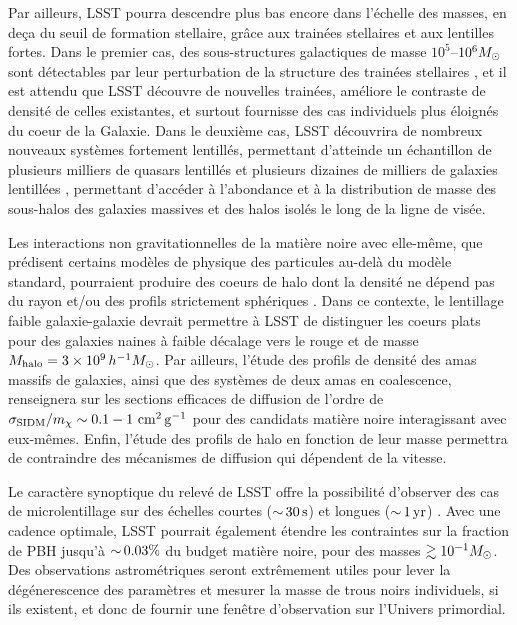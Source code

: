 \documentclass[12pt]{article}
\begin{document}
Par ailleurs, LSST pourra descendre plus bas encore dans l'échelle des masses, en deça du seuil de formation stellaire, grâce aux trainées stellaires et aux lentilles fortes. Dans le premier cas, des sous-structures galactiques de masse $10^5$--$10^6 M_\odot$ sont détectables par leur perturbation de la structure des trainées stellaires \citep[][]{erkal2016,bovy:2017}, et il est attendu que LSST découvre de nouvelles trainées, améliore le contraste de densité de celles existantes, et surtout fournisse des cas individuels plus éloignés du coeur de la Galaxie. Dans le deuxième cas, LSST découvrira de nombreux nouveaux systèmes fortement lentillés, permettant d'atteinde un échantillon de plusieurs milliers de quasars lentillés \citep{O+M10} et plusieurs dizaines de milliers de galaxies lentillées \citep{Collett2015}, permettant d'accéder à l'abondance et à la distribution de masse des sous-halos des galaxies massives et des halos isolés le long de la ligne de visée.

Les interactions non gravitationnelles de la matière noire avec elle-même, que prédisent certains modèles de physique des particules au-delà du modèle standard, pourraient produire des coeurs de halo dont la densité ne dépend pas du rayon \citep[coeurs `plats', ][]{Spergel:1999mh} et/ou des profils strictement sphériques \citep{Peter:2013}.
Dans ce contexte, le lentillage faible galaxie-galaxie devrait permettre à LSST de distinguer les coeurs plats pour des galaxies naines à faible décalage vers le rouge et de masse $M_\text{halo} = 3\times10^9\,h^{-1}M_\odot$. Par ailleurs, l'étude des profils de densité des amas massifs de galaxies, ainsi que des systèmes de deux amas en coalescence, renseignera sur les sections efficaces de diffusion de l'ordre de $\sigma_{\rm SIDM}/m_\chi \sim 0.1-1 \mathrm{\,\mathrm{\,cm}^2\mathrm{\,g}^{-1}}$ pour des candidats matière noire interagissant avec eux-mêmes. Enfin, l'étude des profils de halo en fonction de leur masse permettra de contraindre des mécanismes de diffusion qui dépendent de la vitesse. 

Le caractère synoptique du relevé de LSST offre la possibilité d'observer des cas de microlentillage sur des échelles courtes ($ {\sim}\, 30 \mathrm{\,s}$) et longues ($ {\sim}\,1 \mathrm{\,yr}$) \citep{1509.04899}. 
Avec une cadence optimale, LSST pourrait également étendre les contraintes sur la fraction de PBH jusqu'à $ {\sim}\,0.03\%$ du budget matière noire, pour des masses $\gtrsim 10^{-1} M_\odot$. Des observations astrométriques seront extrêmement utiles pour lever la dégénerescence des paramètres et mesurer la masse de trous noirs individuels, si ils existent, et donc de fournir une fenêtre d'observation sur l'Univers primordial.
\end{document}
